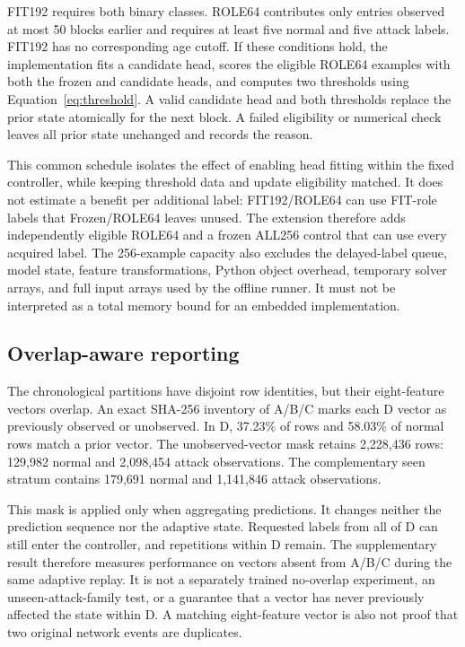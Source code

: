 FIT192 requires both binary classes. ROLE64 contributes only entries observed at most 50 blocks earlier and requires at least five normal and five attack labels. FIT192 has no corresponding age cutoff. If these conditions hold, the implementation fits a candidate head, scores the eligible ROLE64 examples with both the frozen and candidate heads, and computes two thresholds using Equation~\ref{eq:threshold}. A valid candidate head and both thresholds replace the prior state atomically for the next block. A failed eligibility or numerical check leaves all prior state unchanged and records the reason.

This common schedule isolates the effect of enabling head fitting within the fixed controller, while keeping threshold data and update eligibility matched. It does not estimate a benefit per additional label: FIT192/ROLE64 can use FIT-role labels that Frozen/ROLE64 leaves unused. The extension therefore adds independently eligible ROLE64 and a frozen ALL256 control that can use every acquired label. The 256-example capacity also excludes the delayed-label queue, model state, feature transformations, Python object overhead, temporary solver arrays, and full input arrays used by the offline runner. It must not be interpreted as a total memory bound for an embedded implementation.

\subsection{Overlap-aware reporting}\label{sec:overlap}
The chronological partitions have disjoint row identities, but their eight-feature vectors overlap. An exact SHA-256 inventory of A/B/C marks each D vector as previously observed or unobserved. In D, 37.23\% of rows and 58.03\% of normal rows match a prior vector. The unobserved-vector mask retains 2,228,436 rows: 129,982 normal and 2,098,454 attack observations. The complementary seen stratum contains 179,691 normal and 1,141,846 attack observations.

This mask is applied only when aggregating predictions. It changes neither the prediction sequence nor the adaptive state. Requested labels from all of D can still enter the controller, and repetitions within D remain. The supplementary result therefore measures performance on vectors absent from A/B/C during the same adaptive replay. It is not a separately trained no-overlap experiment, an unseen-attack-family test, or a guarantee that a vector has never previously affected the state within D. A matching eight-feature vector is also not proof that two original network events are duplicates.

